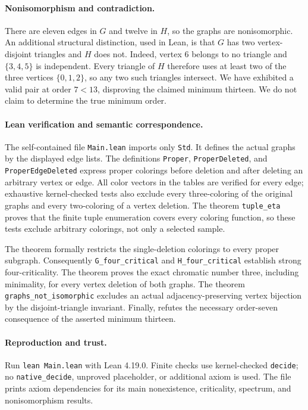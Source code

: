 \documentclass[10pt]{article}
\begin{document}
\paragraph{Nonisomorphism and contradiction.}
There are eleven edges in $G$ and twelve in $H$, so the graphs
are nonisomorphic. An additional structural distinction, used
in Lean, is that $G$ has two vertex-disjoint triangles and $H$
does not. Indeed, vertex $6$ belongs to no triangle and
$\{3,4,5\}$ is independent. Every triangle of $H$ therefore
uses at least two of the three vertices $\{0,1,2\}$, so any
two such triangles intersect.
We have exhibited a valid pair at order $7<13$, disproving
the claimed minimum thirteen. We do not claim to determine
the true minimum order.

\paragraph{Lean verification and semantic correspondence.}
The self-contained file \texttt{Main.lean} imports only
\texttt{Std}. It defines the actual graphs by the displayed edge lists.
The definitions \texttt{Proper}, \texttt{ProperDeleted},
and \texttt{ProperEdgeDeleted} express proper colorings before
deletion and after deleting an arbitrary vertex or edge.
All color vectors in the tables are verified for every edge;
exhaustive kernel-checked tests also exclude every three-coloring
of the original graphs and every two-coloring of a vertex deletion.
The theorem \texttt{tuple\_eta} proves that the finite tuple
enumeration covers every coloring function, so these tests
exclude arbitrary colorings, not only a selected sample.

The theorem  formally restricts
the single-deletion colorings to every proper subgraph.
Consequently \texttt{G\_four\_critical} and
\texttt{H\_four\_critical} establish strong four-criticality.
The theorem  proves the exact
chromatic number three, including minimality, for every vertex
deletion of both graphs.
The theorem \texttt{graphs\_not\_isomorphic} excludes an actual
adjacency-preserving vertex bijection by the disjoint-triangle
invariant.
Finally,  refutes the
necessary order-seven consequence of the asserted minimum thirteen.

\paragraph{Reproduction and trust.}
Run \texttt{lean Main.lean} with Lean 4.19.0.
Finite checks use kernel-checked \texttt{decide}; no
\texttt{native\_decide}, unproved placeholder, or additional axiom
is used. The file prints axiom dependencies for its main
nonexistence, criticality, spectrum, and nonisomorphism results.
\end{document}
